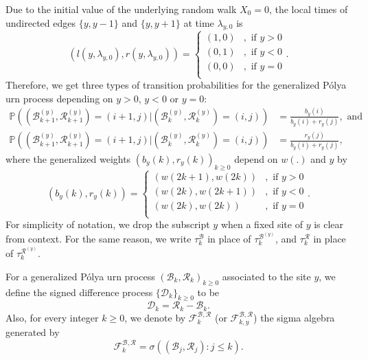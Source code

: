 \documentclass[twoside,12pt,a4paper]{article}
\numberwithin{equation}{section}
\begin{document}
	   Due to the initial value of the underlying random walk $X_0=0$, the local times of undirected edges $\{y,y-1\}$ and $\{y,y+1\}$ at time $\lambda_{y,0}$ is 
	\begin{equation}\label{eq: initial condition}
		\left(l(y,\lambda_{y,0}),  r( y ,\lambda_{y,0})\right) =  \begin{cases}	
			(1, 0) &,  \text{ if }  y>0 \\
			(0, 1) &,  \text{ if }  y<0 \\  
			(0, 0) &,  \text{ if }  y=0 \\
		\end{cases} 
	.\end{equation}	
	Therefore, we get three types of transition probabilities
	for the generalized P\'{o}lya urn process depending on $y>0$, $y<0$ or $y=0$:
	\begin{align*}\label{eq: transition prob for GPU}
		\mathbb{P} \left(\left(\mathcal{B}^{(y)}_{k+1},\mathcal{R}^{(y)}_{k+1} \right)=  (i+1,j) \vert (\mathcal{B}^{(y)}_{k},\mathcal{R}^{(y)}_{k}) =(i,j)  \right) &= \frac{b_y(i)}{b_y(i)+r_y(j)}, \mbox{ and}  \\
		\mathbb{P} \left((\mathcal{B}^{(y)}_{k+1},\mathcal{R}^{(y)}_{k+1})=  (i+1,j) \vert (\mathcal{B}^{(y)}_{k},\mathcal{R}^{(y)}_{k}) =(i,j)  \right) &= \frac{r_y(j)}{b_y(i)+r_y(j)},
	\end{align*} 
	where the generalized weights $(b_y(k),r_y(k))_{k\geq 0}$ depend on $w(.)$ and $y$ by  
	\begin{equation}\label{eq: generalized weights}
		(b_y(k), r_y(k)) = \begin{cases}
			(w(2k+1), w(2k)) &,  \text{ if }  y>0 \\
			(w(2k), w(2k+1)) &,  \text{ if }  y<0 \\  
			(w(2k), w(2k)) &,  \text{ if }  y=0 \\ 
		\end{cases}.
	\end{equation}
	For simplicity of notation, we drop the subscript $y$ when a fixed site of $y$ is clear from context. For the same reason, we write $\tau_k^{\mathcal{B}}$ in place of $\tau_k^{\mathcal{B}^{(y)}}$, and $\tau_k^{\mathcal{R}}$ in place of $\tau_k^{\mathcal{R}^{(y)}}$.

	For a generalized P\'{o}lya urn process $(\mathcal{B}_k,\mathcal{R}_k )_{k\geq 0}$ associated to the site $y$, we define the signed difference process $\{\mathcal{D}_{k}\}_{k \ge 0} $ to be
	\begin{equation}\label{eq:signed difference}
		\mathcal{D}_k  =\mathcal{R}_k -\mathcal{B}_k.  
	\end{equation}
	Also, for every integer $k\geq 0$, we denote by $\mathcal{F}^{\mathcal{B},\mathcal{R}}_k$ (or $\mathcal{F}^{\mathcal{B},\mathcal{R}}_{k,y}$) the sigma algebra generated by  
	\[\mathcal{F}^{\mathcal{B},\mathcal{R}}_k = \sigma\left((\mathcal{B}_j,\mathcal{R}_j ): j\leq k \right).
	\]  
		
\end{document}
